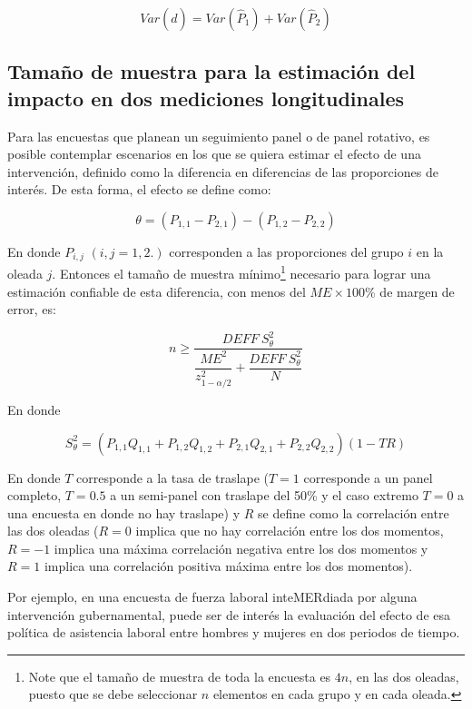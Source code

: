 \documentclass[
  12pt,
  spanish,
]{book}
\begin{document}
\[
Var(\hat{d}) 
= Var(\hat{P}_1) + Var(\hat{P}_2)
\]

\hypertarget{tamauxf1o-de-muestra-para-la-estimaciuxf3n-del-impacto-en-dos-mediciones-longitudinales}{%
\subsection{Tamaño de muestra para la estimación del impacto en dos mediciones longitudinales}\label{tamauxf1o-de-muestra-para-la-estimaciuxf3n-del-impacto-en-dos-mediciones-longitudinales}}

Para las encuestas que planean un seguimiento panel o de panel rotativo, es posible contemplar escenarios en los que se quiera estimar el efecto de una intervención, definido como la diferencia en diferencias de las proporciones de interés. De esta forma, el efecto se define como:

\[
\theta = (P_{1,1}-P_{2,1})-(P_{1,2}-P_{2, 2})
\]

En donde \(P_{i,j}\) \((i, j = 1, 2.)\) corresponden a las proporciones del grupo \(i\) en la oleada \(j\). Entonces el tamaño de muestra mínimo\footnote{Note que el tamaño de muestra de toda la encuesta es \(4n\), en las dos oleadas, puesto que se debe seleccionar \(n\) elementos en cada grupo y en cada oleada.} necesario para lograr una estimación confiable de esta diferencia, con menos del \(ME \times 100\%\) de margen de error, es:

\[
n \geq \dfrac{DEFF \ S^2_{\theta}}{\dfrac{ME^2}{z_{1 - \alpha/2}^2}+\dfrac{DEFF \ S^2_{\theta}}{N}}
\]

En donde

\[
S^2_{\theta} = (P_{1,1}Q_{1,1}+P_{1,2}Q_{1,2}+P_{2,1}Q_{2,1}+P_{2,2}Q_{2,2})(1-TR)
\]

En donde \(T\) corresponde a la tasa de traslape (\(T=1\) corresponde a un panel completo, \(T=0.5\) a un semi-panel con traslape del 50\% y el caso extremo \(T=0\) a una encuesta en donde no hay traslape) y \(R\) se define como la correlación entre las dos oleadas (\(R=0\) implica que no hay correlación entre los dos momentos, \(R=-1\) implica una máxima correlación negativa entre los dos momentos y \(R=1\) implica una correlación positiva máxima entre los dos momentos).

Por ejemplo, en una encuesta de fuerza laboral inteMERdiada por alguna intervención gubernamental, puede ser de interés la evaluación del efecto de esa política de asistencia laboral entre hombres y mujeres en dos periodos de tiempo.
\end{document}
